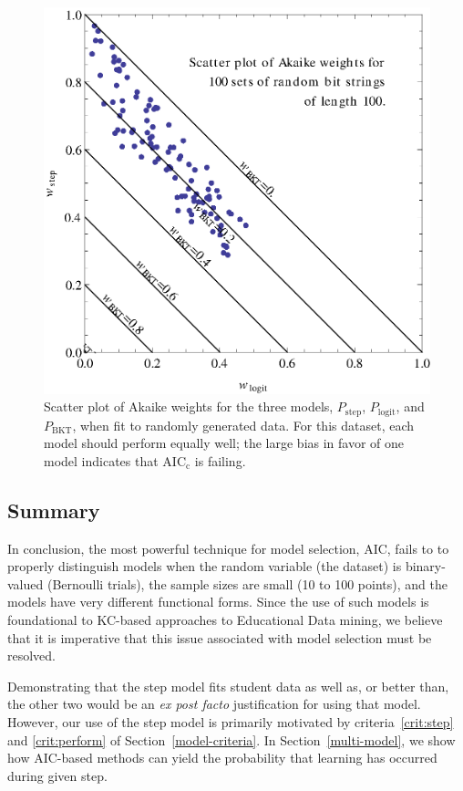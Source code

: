 \documentclass[prodmode,acmtecs]{acmsmall}
\begin{document}
\begin{figure}
  \centering \includegraphics{scatter-random-weights.eps}
  \caption{Scatter plot of Akaike weights for the three models, 
   $P_\mathrm{step}$, $P_\mathrm{logit}$, and $P_\mathrm{BKT}$, 
   when fit to randomly generated data.  For this dataset, each 
   model should perform
   equally well; the large bias in favor of one model indicates
   that  AIC$_\mathrm{c}$ is failing.}\label{scatter2}
\end{figure}

\subsection{Summary}

In conclusion, the most powerful technique for model selection,
AIC, fails to to properly distinguish models when the random
variable (the dataset) is binary-valued (Bernoulli trials),
the sample sizes are small (10 to 100 points), and the models
have very different functional forms.  Since the use of such
models is foundational to KC-based approaches to Educational
Data mining, we believe that it is imperative that this issue 
associated with model selection must be resolved.

Demonstrating that the step model fits student data as well as,
or better than, the other two would be an
{\em ex post facto} justification for using that model.  
However, our use of the step model is primarily motivated
by criteria~\ref{crit:step} and \ref{crit:perform} of 
Section~\ref{model-criteria}.
In Section~\ref{multi-model}, we show how AIC-based methods
can yield the probability that learning has occurred during given step.
\end{document}
